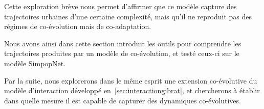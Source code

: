 Cette exploration brève nous permet d'affirmer que ce modèle capture des trajectoires urbaines d'une certaine complexité, mais qu'il ne reproduit pas des régimes de co-évolution mais de co-adaptation.




\stars

Nous avons ainsi dans cette section introduit les outils pour comprendre les trajectoires produites par un modèle de co-évolution, et testé ceux-ci sur le modèle SimpopNet.

Par la suite, nous explorerons dans le même esprit une extension co-évolutive du modèle d'interaction développé en~\ref{sec:interactiongibrat}, et chercherons à établir dans quelle mesure il est capable de capturer des dynamiques co-évolutives.



\stars








